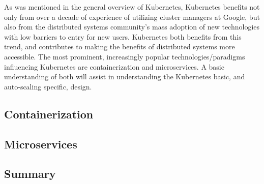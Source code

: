 As was mentioned in the general overview of Kubernetes, Kubernetes benefits not
only from over a decade of experience of utilizing cluster managers at Google,
but also from the distributed systems community's mass adoption of new
technologies with low barriers to entry for new users. Kubernetes both benefits
from this trend, and contributes to making the benefits of distributed systems
more accessible. The most prominent, increasingly popular technologies/paradigms
influencing Kubernetes are containerization and microservices.
A basic understanding of both will assist
in understanding the Kubernetes basic, and auto-scaling specific, design.

\subsection{Containerization}
\label{architecture-building-blocks-of-kubernetes-containerization}



\subsection{Microservices}
\label{architecture-building-blocks-of-kubernetes-microservices}



\subsection{Summary}


